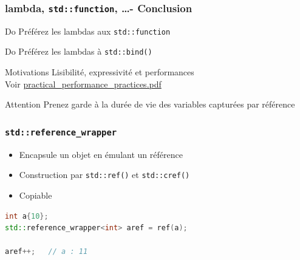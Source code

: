 \documentclass[C++.tex]{subfiles}
\begin{document}
\begin{frame}[fragile]
	\frametitle{lambda, \lstinline|std::function|, \ldots - Conclusion}
	\begin{exampleblock}{Do}
		Préférez les lambdas aux \lstinline|std::function|
	\end{exampleblock}

	\begin{exampleblock}{Do}
		Préférez les lambdas à \lstinline|std::bind()|
	\end{exampleblock}


	\begin{block}{Motivations}
		Lisibilité, expressivité et performances \\
		Voir \href{https://github.com/boostcon/cppnow_presentations_2016/blob/master/00_tuesday/practical_performance_practices.pdf}{practical\_performance\_practices.pdf}

	\end{block}

	\begin{alertblock}{Attention}
		Prenez garde à la durée de vie des variables capturées par référence
	\end{alertblock}
\end{frame}

\begin{frame}[fragile]
	\frametitle{\lstinline|std::reference_wrapper|}
	\begin{itemize}
		\item Encapsule un objet en émulant un référence
		\item Construction par \lstinline|std::ref()| et \lstinline|std::cref()|
		\item Copiable
	\end{itemize}

	\begin{lstlisting}[language=C++]
int a{10};
std::reference_wrapper<int> aref = ref(a);

aref++;   // a : 11\end{lstlisting}
\end{frame}
\end{document}
